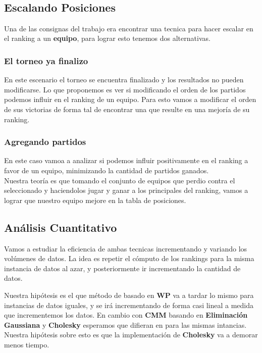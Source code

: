 \\



\subsection{Escalando Posiciones}

Una de las consignas del trabajo era encontrar una tecnica para hacer escalar en el ranking a un \textbf{equipo}, para lograr esto tenemos dos alternativas. \\


\subsubsection{El torneo ya finalizo}

En este escenario el torneo se encuentra finalizado y los resultados no pueden modificarse. Lo que proponemos es ver si modificando el orden de los partidos podemos influir en el ranking de un equipo. Para esto vamos a modificar el orden de sus victorias de forma tal de encontrar una que resulte en una mejoría de su ranking. \\


\subsubsection{Agregando partidos}

En este caso vamoa a analizar si podemos influir positivamente en el ranking a favor de un equipo, minimizando la cantidad de partidos ganados. \\

Nuestra teoría es que tomando el conjunto de equipos que perdio contra el seleccionado y haciendolos jugar y ganar a los principales del ranking, vamos a lograr que nuestro equipo mejore en la tabla de posiciones. \\



\subsection{Análisis Cuantitativo}


Vamos a estudiar la eficiencia de ambas tecnicas incrementando y variando los volúmenes de datos. La idea es repetir el cómputo de los rankings para la misma instancia de datos al azar, y posteriormente ir incrementando la cantidad de datos.

Nuestra hipótesis es el que método de basado en \textbf{WP} va a tardar lo mismo para instancias de datos iguales, y se irá incrementando de forma casi lineal a medida que incrementemos los datos. En cambio con \textbf{CMM} basando en \textbf{Eliminación Gaussiana} y \textbf{Cholesky} esperamos que difieran en para las mismas intancias. Nuestra hipótesis sobre esto es que la implementación de \textbf{Cholesky} va a demorar menos tiempo.


 




